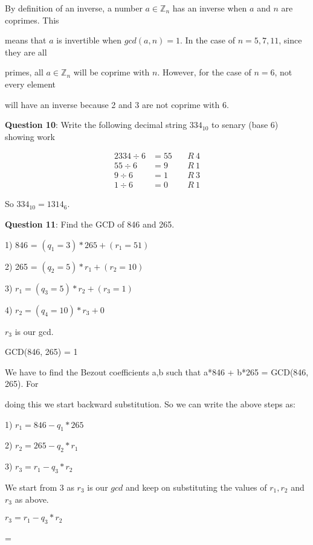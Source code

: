 \documentclass{article} %
\newcommand{\question}[2][]{\begin{flushleft}
        \textbf{Question #1}: #2

\end{flushleft}}
\begin{document}
    By definition of an inverse, a number $a \in \mathbb{Z}_n$ has an inverse when $a$ and $n$ are coprimes. This 
    
    means that $a$ is invertible when $gcd(a, n) = 1$. In the case of $n = 5, 7, 11$, since they are all 
    
    primes, all $a \in \mathbb{Z}_n$ will be coprime with $n$. However, for the case of $n = 6$, not every element 
    
    will have an inverse because 2 and 3 are not coprime with 6.

    \question[10]{Write the following decimal string $334_{10}$ to senary (base 6) showing work}
    \begin{alignat*}{2}
        334 \div 6 &= 55\ &&R\ 4\\
        55  \div 6 &= 9   &&R\ 1\\
        9   \div 6 &= 1   &&R\ 3\\
        1   \div 6 &= 0   &&R\ 1
    \end{alignat*}

    So $334_{10} = 1314_6$.

    \question[11]{Find the GCD of 846 and 265.}

    1) 846 = $(q_1 = 3) * 265 + (r_1 = 51)$

    2) 265 = $(q_2 = 5) * r_1 + (r_2 = 10)$

    3) $r_1 = (q_3 = 5) * r_2 + (r_3 = 1)$

    4) $r_2 = (q_4 = 10) * r_3 + 0$

    $r_3$ is our gcd.

    GCD(846, 265) = 1

    We have to find the Bezout coefficients a,b such that a*846 + b*265 = GCD(846, 265). For 
    
    doing this we start backward substitution. So we can write the above steps as:

    1) $r_1 = 846 - q_1*265$ 

    2) $r_2 = 265 - q_2*r_1$

    3) $r_3 = r_1 - q_3*r_2$

    We start from 3 as $r_3$ is our $gcd$ and keep on substituting the values of $r_1,r_2$ and $r_3$ as above. 

    $r_3 = r_1 - q_3*r_2$

    = $ $
\end{document}
